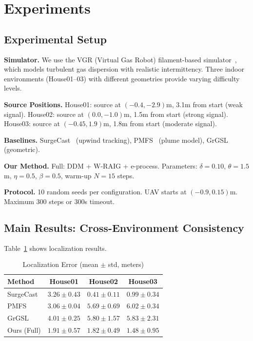 \section{Experiments}
\label{sec:experiments}

\subsection{Experimental Setup}

\textbf{Simulator.} We use the VGR (Virtual Gas Robot) filament-based simulator~\cite{ref14}, which models turbulent gas dispersion with realistic intermittency. Three indoor environments (House01--03) with different geometries provide varying difficulty levels.

\textbf{Source Positions.} House01: source at $(-0.4, -2.9)$m, 3.1m from start (weak signal). House02: source at $(0.0, -1.0)$m, 1.5m from start (strong signal). House03: source at $(-0.45, 1.9)$m, 1.8m from start (moderate signal).

\textbf{Baselines.} SurgeCast~\cite{ref5} (upwind tracking), PMFS~\cite{ref6} (plume model), GrGSL~\cite{ref7} (geometric).

\textbf{Our Method.} Full: DDM + W-RAIG + e-process. Parameters: $\delta = 0.10$, $\theta = 1.5$m, $\eta = 0.5$, $\beta = 0.5$, warm-up $N = 15$ steps.

\textbf{Protocol.} 10 random seeds per configuration. UAV starts at $(-0.9, 0.15)$m. Maximum 300 steps or 300s timeout.

\subsection{Main Results: Cross-Environment Consistency}

Table~\ref{tab:main} shows localization results.

\begin{table}[htbp]
\centering
\caption{Localization Error (mean $\pm$ std, meters)}
\label{tab:main}
\begin{tabular}{lccc}
\toprule
Method & House01 & House02 & House03 \\
\midrule
SurgeCast & $3.26 \pm 0.43$ & $\mathbf{0.41 \pm 0.11}$ & $0.99 \pm 0.34$ \\
PMFS & $3.06 \pm 0.04$ & $5.69 \pm 0.69$ & $6.02 \pm 0.34$ \\
GrGSL & $4.01 \pm 0.25$ & $5.80 \pm 1.57$ & $5.83 \pm 2.31$ \\
\midrule
Ours (Full) & $\mathbf{1.91 \pm 0.57}$ & $1.82 \pm 0.49$ & $\mathbf{1.48 \pm 0.95}$ \\
\bottomrule
\end{tabular}
\end{table}


